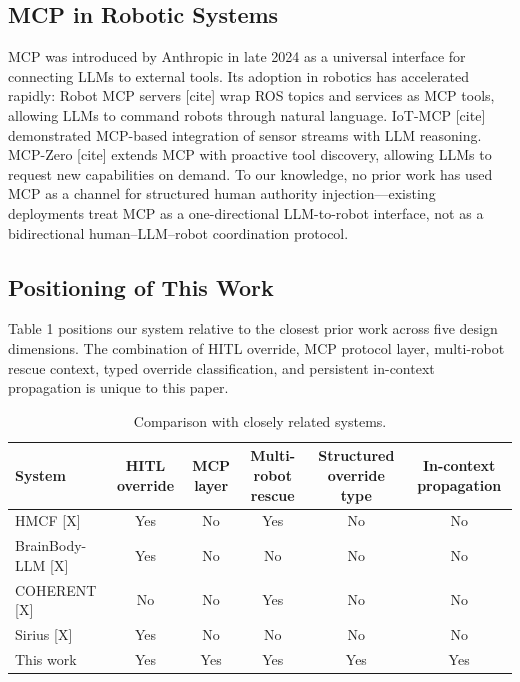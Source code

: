 \subsection{MCP in Robotic Systems}
MCP was introduced by Anthropic in late 2024 as a universal interface for connecting LLMs to external tools. Its adoption in robotics has accelerated rapidly: Robot MCP servers [cite] wrap ROS topics and services as MCP tools, allowing LLMs to command robots through natural language. IoT-MCP [cite] demonstrated MCP-based integration of sensor streams with LLM reasoning. MCP-Zero [cite] extends MCP with proactive tool discovery, allowing LLMs to request new capabilities on demand. To our knowledge, no prior work has used MCP as a channel for structured human authority injection—existing deployments treat MCP as a one-directional LLM-to-robot interface, not as a bidirectional human–LLM–robot coordination protocol.

\subsection{Positioning of This Work}

Table 1 positions our system relative to the closest prior work across five design dimensions. The combination of HITL override, MCP protocol layer, multi-robot rescue context, typed override classification, and persistent in-context propagation is unique to this paper.


\begin{table}[t]
\centering
\caption{Comparison with closely related systems.}
\label{tab:comparison}

\small
\setlength{\tabcolsep}{4pt}
\renewcommand{\arraystretch}{1.1}

\begin{tabular}{lccccc}
\toprule
\textbf{System} & \textbf{HITL override} & \textbf{MCP layer} & \textbf{Multi-robot rescue} & \textbf{Structured override type} & \textbf{In-context propagation} \\
\midrule
HMCF [X] & Yes & No & Yes & No & No \\
BrainBody-LLM [X] & Yes & No & No & No & No \\
COHERENT [X] & No & No & Yes & No & No \\
Sirius [X] & Yes & No & No & No & No \\
This work & Yes & Yes & Yes & Yes & Yes \\
\bottomrule
\end{tabular}
\end{table}